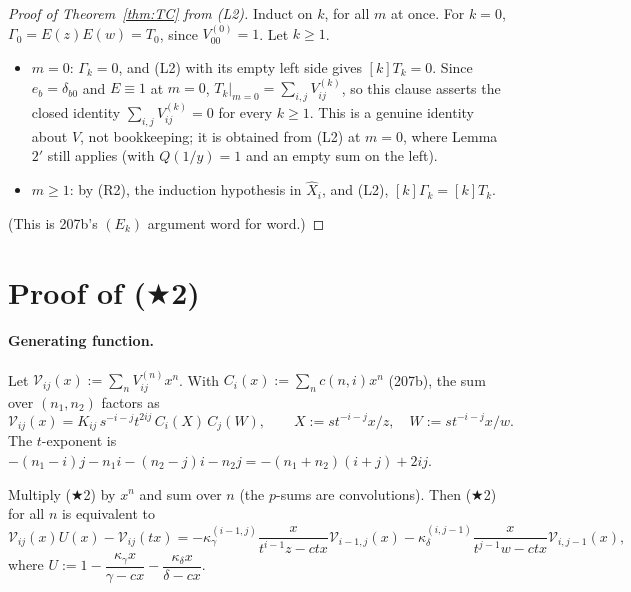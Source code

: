 \documentclass[11pt]{amsart}
\theoremstyle{remark}
\newcommand{\hX}{\widehat{X}}
\newcommand{\cV}{\mathcal{V}}
\begin{document}
\begin{proof}[Proof of Theorem~\ref{thm:TC} from (L2)]
Induct on $k$, for all $m$ at once. For $k=0$, $\Gamma_0=E(z)E(w)=T_0$, since $V^{(0)}_{00}=1$. Let $k\ge1$.
\begin{itemize}
\item $m=0$: $\Gamma_k=0$, and (L2) with its empty left side gives $[k]T_k=0$. Since $e_b=\delta_{b0}$ and $E\equiv1$ at $m=0$, $T_k|_{m=0}=\sum_{i,j}V^{(k)}_{ij}$, so this clause asserts the closed identity $\sum_{i,j}V^{(k)}_{ij}=0$ for every $k\ge1$. This is a genuine identity about $V$, not bookkeeping; it is obtained from (L2) at $m=0$, where Lemma~$2'$ still applies (with $Q(1/y)=1$ and an empty sum on the left).
\item $m\ge1$: by (R2), the induction hypothesis in $\hX_i$, and (L2), $[k]\Gamma_k=[k]T_k$.
\end{itemize}
(This is 207b's $(E_k)$ argument word for word.)
\end{proof}

\section{Proof of \texorpdfstring{($\bigstar$2)}{(*2)}}\label{sec:star2}

\paragraph{Generating function.} Let $\cV_{ij}(x):=\sum_nV^{(n)}_{ij}x^n$. With $C_i(x):=\sum_nc(n,i)x^n$ (207b), the sum over $(n_1,n_2)$ factors as
\[
\cV_{ij}(x)=K_{ij}\,s^{-i-j}t^{2ij}\,C_i(X)\,C_j(W),\qquad X:=st^{-i-j}x/z,\quad W:=st^{-i-j}x/w.
\]
The $t$-exponent is $-(n_1-i)j-n_1i-(n_2-j)i-n_2j=-(n_1+n_2)(i+j)+2ij$.

Multiply ($\bigstar$2) by $x^n$ and sum over $n$ (the $p$-sums are convolutions). Then ($\bigstar$2) for all $n$ is equivalent to
\begin{equation}\tag{$\bigstar$2-GF}
\cV_{ij}(x)U(x)-\cV_{ij}(tx)=-\kappa_\gamma^{(i-1,j)}\frac{x}{t^{i-1}z-ctx}\cV_{i-1,j}(x)-\kappa_\delta^{(i,j-1)}\frac{x}{t^{j-1}w-ctx}\cV_{i,j-1}(x),
\end{equation}
where $U:=1-\dfrac{\kappa_\gamma x}{\gamma-cx}-\dfrac{\kappa_\delta x}{\delta-cx}$.
\end{document}
